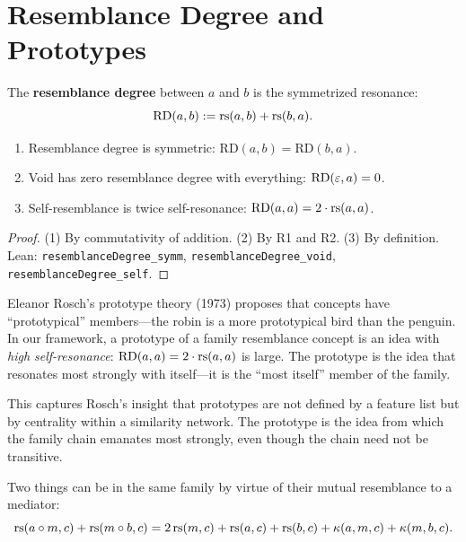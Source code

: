 \section{Resemblance Degree and Prototypes}

\begin{definition}
\label{def:resemblance-degree}
The \textbf{resemblance degree} between $a$ and $b$ is the symmetrized
resonance:
\[
\mathrm{RD}(a, b) := \mathrm{rs}(a, b) + \mathrm{rs}(b, a).
\]
\end{definition}

\begin{theorem}
\label{thm:resemblance-properties}
\begin{enumerate}
\item Resemblance degree is symmetric: $\mathrm{RD}(a,b) = \mathrm{RD}(b,a)$.
\item Void has zero resemblance degree with everything: $\mathrm{RD}(\varepsilon, a) = 0$.
\item Self-resemblance is twice self-resonance: $\mathrm{RD}(a, a) = 2 \cdot \mathrm{rs}(a, a)$.
\end{enumerate}
\end{theorem}

\begin{proof}
(1) By commutativity of addition. (2) By R1 and R2. (3) By definition.
Lean: \texttt{resemblanceDegree\_symm}, \texttt{resemblanceDegree\_void},
\texttt{resemblanceDegree\_self}.
\end{proof}

\begin{interpretation}
\label{interp:prototypes}
Eleanor Rosch's prototype theory (1973) proposes that concepts have
``prototypical'' members---the robin is a more prototypical bird than the
penguin. In our framework, a prototype of a family resemblance concept is an
idea with \emph{high self-resonance}: $\mathrm{RD}(a, a) = 2 \cdot \mathrm{rs}(a, a)$
is large. The prototype is the idea that resonates most strongly with itself---it
is the ``most itself'' member of the family.

This captures Rosch's insight that prototypes are not defined by a feature
list but by centrality within a similarity network. The prototype is the idea
from which the family chain emanates most strongly, even though the chain
need not be transitive.
\end{interpretation}

\begin{theorem}
\label{thm:overlapping}
Two things can be in the same family by virtue of their mutual resemblance
to a mediator:
\[
\mathrm{rs}(a \circ m, c) + \mathrm{rs}(m \circ b, c) =
2\,\mathrm{rs}(m, c) + \mathrm{rs}(a, c) + \mathrm{rs}(b, c) +
\kappa(a, m, c) + \kappa(m, b, c).
\]
\end{theorem}

